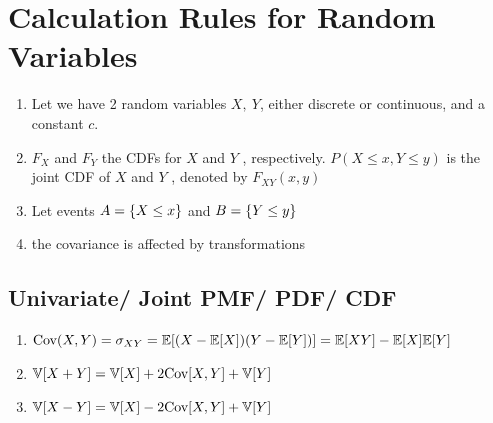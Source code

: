 \section{Calculation Rules for Random Variables}

\begin{enumerate}
    \item Let we have 2 random variables $X, \ Y$, either discrete or continuous, and a constant $c$.
    
    \item $F _X$ and $F_Y$ the CDFs for $X$ and $Y$ , respectively. $P(X \leq x, Y \leq y)$ is the joint CDF of $X$ and $Y$ , denoted by $F _{X Y} (x, y)$
    
    \item Let events $A = \left\{X \leq x\right\}$ and $B = \left\{Y \leq y\right\}$
    
    \item the covariance is affected by transformations
\end{enumerate}


\subsection{Univariate/ Joint PMF/ PDF/ CDF}

\begin{enumerate}[series=calcrulesrv]
    \item $
        \text{Cov}(X, Y ) 
        = \sigma_{X Y} 
        = \mathbb{E}[(X - \mathbb{E}[X])(Y - \mathbb{E}[Y])]
        = \mathbb{E}[X Y] - \mathbb{E}[X]\mathbb{E}[Y]
    $
    \hfill \cite{statistics/book/Statistics-for-Data-Scientists/Maurits-Kaptein}

    \item $\mathbb{V}[X + Y] = \mathbb{V}[X] + 2\text{Cov}[X, Y] + \mathbb{V}[Y]$
    \hfill \cite{statistics/book/Statistics-for-Data-Scientists/Maurits-Kaptein}

    \item $\mathbb{V}[X - Y] = \mathbb{V}[X] - 2\text{Cov}[X, Y] + \mathbb{V}[Y]$
    \hfill \cite{statistics/book/Statistics-for-Data-Scientists/Maurits-Kaptein}
\end{enumerate}



